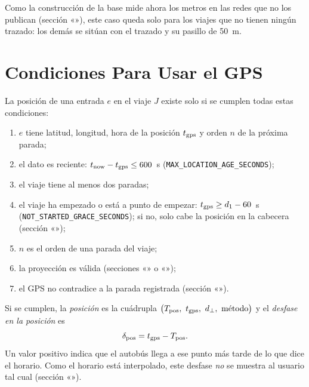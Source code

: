 Como la construcción de la base mide ahora los metros en las redes que no los publican (sección
«»), este caso queda solo para los viajes que no tienen ningún trazado: los demás se sitúan
con el trazado y su pasillo de 50~m.

\section{Condiciones Para Usar el GPS}
\label{sec:condiciones-gps}

La posición de una entrada $e$ en el viaje $J$ existe solo si se cumplen todas estas condiciones:

\begin{enumerate}
  \item $e$ tiene latitud, longitud, hora de la posición $t_{\mathrm{gps}}$ y orden $n$ de la próxima parada;
  \item el dato es reciente: $t_{\mathrm{now}}-t_{\mathrm{gps}}\le600$~s (\texttt{MAX\_LOCATION\_AGE\_SECONDS});
  \item el viaje tiene al menos dos paradas;
  \item el viaje ha empezado o está a punto de empezar: $t_{\mathrm{gps}}\ge d_1-60$~s (\texttt{NOT\_STARTED\_GRACE\_SECONDS}); si
        no, solo cabe la posición en la cabecera (sección «»);
  \item $n$ es el orden de una parada del viaje;
  \item la proyección es válida (secciones «» o «»);
  \item el GPS no contradice a la parada registrada (sección «»).
\end{enumerate}

Si se cumplen, la \emph{posición} es la cuádrupla $\big(\Tpos,\ \tgps,\ d_\perp,\ \text{método}\big)$ y el
\emph{desfase en la posición} es
\begin{equation}
\label{eq:desfase-pos}
\delta_{\mathrm{pos}}=t_{\mathrm{gps}}-T_{\mathrm{pos}}.
\end{equation}
Un valor positivo indica que el autobús llega a ese punto más tarde de lo que dice el horario. Como el horario está
interpolado, este desfase \emph{no} se muestra al usuario tal cual (sección «»).


